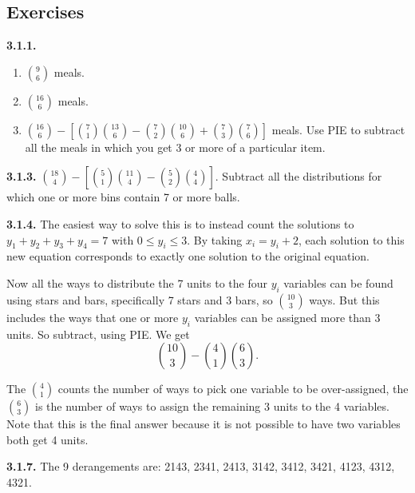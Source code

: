 \documentclass[10pt,]{book}
\theoremstyle{plain}
\theoremstyle{definition}
\theoremstyle{definition}
\theoremstyle{definition}
\numberwithin{equation}{chapter}
\begin{document}
\subsection*{ Exercises}
\noindent\textbf{3.1.1.} \hypertarget{p-1153}{}%
\leavevmode%
\begin{enumerate}[label=(\alph*)]
\item\hypertarget{li-94}{}\({9 \choose 6}\) meals.%
\item\hypertarget{li-95}{}\({16 \choose 6}\) meals.%
\item\hypertarget{li-96}{}\({16 \choose 6} - \left[{7 \choose 1}{13 \choose 6} - {7 \choose 2}{10 \choose 6} + {7 \choose 3}{7 \choose 6}\right]\) meals.  Use PIE to subtract all the meals in which you get 3 or more of a particular item.%
\end{enumerate}
%
\par\smallskip
\noindent\textbf{3.1.3.} \hypertarget{p-1159}{}%
\({18 \choose 4} - \left[ {5 \choose 1}{11 \choose 4} - {5 \choose 2}{4 \choose 4}\right]\). Subtract all the distributions for which one or more bins contain 7 or more balls.%
\par\smallskip
\noindent\textbf{3.1.4.} \hypertarget{p-1161}{}%
The easiest way to solve this is to instead count the solutions to \(y_1 + y_2 + y_3 + y_4 = 7\) with \(0 \le y_i \le 3\). By taking \(x_i = y_i+2\), each solution to this new equation corresponds to exactly one solution to the original equation.%
\par
\hypertarget{p-1162}{}%
Now all the ways to distribute the 7 units to the four \(y_i\) variables can be found using stars and bars, specifically 7 stars and 3 bars, so \({10 \choose 3}\) ways. But this includes the ways that one or more \(y_i\) variables can be assigned more than 3 units. So subtract, using PIE. We get%
\begin{equation*}
{10 \choose 3} - {4\choose 1} {6 \choose 3}.
\end{equation*}
%
\par
\hypertarget{p-1163}{}%
The \({4 \choose 1}\) counts the number of ways to pick one variable to be over-assigned, the \({6 \choose 3}\) is the number of ways to assign the remaining 3 units to the 4 variables.  Note that this is the final answer because it is not possible to have two variables both get 4 units.%
\par\smallskip
\noindent\textbf{3.1.7.} \hypertarget{p-1167}{}%
The 9 derangements are: 2143, 2341, 2413, 3142, 3412, 3421, 4123, 4312, 4321.%
\par\smallskip
\end{document}
